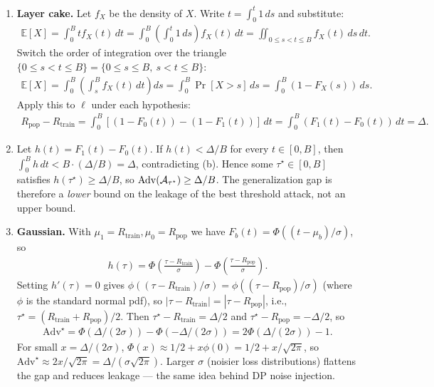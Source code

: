 \documentclass[12pt]{article}
\renewcommand{\fE}{\mathbb{E}}
\begin{document}
\begin{enumerate}
\begin{solution}
\begin{enumerate}
    \item \textbf{Layer cake.} Let $f_X$ be the density of $X$. Write $t = \int_0^t 1\,ds$ and substitute:
    \begin{align*}
        \fE[X] = \int_0^B t f_X(t)\,dt = \int_0^B \!\!\left(\int_0^t 1\,ds\right) f_X(t)\,dt = \iint_{0 \le s < t \le B} f_X(t)\,ds\,dt.
    \end{align*}
    Switch the order of integration over the triangle $\{0 \le s < t \le B\} = \{0 \le s \le B,\ s < t \le B\}$:
    \begin{align*}
        \fE[X] = \int_0^B \!\!\left(\int_s^B f_X(t)\,dt\right) ds = \int_0^B \Pr[X > s]\,ds = \int_0^B (1 - F_X(s))\,ds.
    \end{align*}
    Apply this to $\ell$ under each hypothesis:
    \begin{align*}
        R_{\mathrm{pop}} - R_{\mathrm{train}} = \int_0^B [(1 - F_0(t)) - (1 - F_1(t))]\,dt = \int_0^B (F_1(t) - F_0(t))\,dt = \Delta.
    \end{align*}

    \item Let $h(t) = F_1(t) - F_0(t)$. If $h(t) < \Delta/B$ for every $t \in [0, B]$, then $\int_0^B h\,dt < B \cdot (\Delta/B) = \Delta$, contradicting (b). Hence some $\tau^\star \in [0, B]$ satisfies $h(\tau^\star) \ge \Delta/B$, so $\mathrm{Adv}({\cal A}_{\tau^\star}) \ge \Delta/B$. The generalization gap is therefore a \emph{lower} bound on the leakage of the best threshold attack, not an upper bound.

    \item \textbf{Gaussian.} With $\mu_1 = R_{\mathrm{train}}, \mu_0 = R_{\mathrm{pop}}$ we have $F_b(t) = \Phi((t - \mu_b)/\sigma)$, so
    \begin{align*}
        h(\tau) = \Phi\!\left(\frac{\tau - R_{\mathrm{train}}}{\sigma}\right) - \Phi\!\left(\frac{\tau - R_{\mathrm{pop}}}{\sigma}\right).
    \end{align*}
    Setting $h'(\tau) = 0$ gives $\phi((\tau - R_{\mathrm{train}})/\sigma) = \phi((\tau - R_{\mathrm{pop}})/\sigma)$ (where $\phi$ is the standard normal pdf), so $|\tau - R_{\mathrm{train}}| = |\tau - R_{\mathrm{pop}}|$, i.e., $\tau^\star = (R_{\mathrm{train}} + R_{\mathrm{pop}})/2$. Then $\tau^\star - R_{\mathrm{train}} = \Delta/2$ and $\tau^\star - R_{\mathrm{pop}} = -\Delta/2$, so
    \begin{align*}
        \mathrm{Adv}^\star = \Phi(\Delta/(2\sigma)) - \Phi(-\Delta/(2\sigma)) = 2\Phi(\Delta/(2\sigma)) - 1.
    \end{align*}
    For small $x = \Delta/(2\sigma)$, $\Phi(x) \approx 1/2 + x \phi(0) = 1/2 + x/\sqrt{2\pi}$, so $\mathrm{Adv}^\star \approx 2x/\sqrt{2\pi} = \Delta/(\sigma\sqrt{2\pi})$. Larger $\sigma$ (noisier loss distributions) flattens the gap and reduces leakage --- the same idea behind DP noise injection.
\end{enumerate}
\end{solution}


\end{enumerate}
\end{document}
